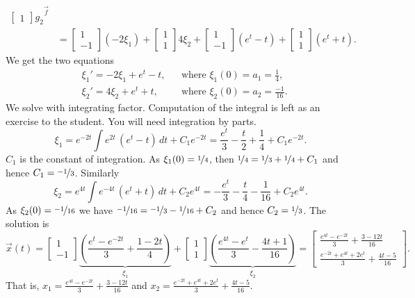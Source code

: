 \begin{example}
\begin{equation*}
\begin{split}
{\begin{bmatrix}
1
\end{bmatrix} g_2
}^{\vec{f}}
\\
& =
\begin{bmatrix}
1 \\
-1
\end{bmatrix} (-2\xi_1) +
\begin{bmatrix}
1 \\
1
\end{bmatrix} 4\xi_2
+
\begin{bmatrix}
1 \\
-1
\end{bmatrix} (e^t - t)
+
\begin{bmatrix}
1 \\
1
\end{bmatrix} (e^t + t) .
\end{split}
\end{equation*}
We get the two equations
\begin{align*}
& \xi_1' = -2\xi_1 + e^t -t, & & \text{where } \xi_1(0) = a_1 = \frac{1}{4} , \\
& \xi_2' = 4\xi_2 + e^t + t, & & \text{where } \xi_2(0) = a_2 = \frac{-1}{16} .
\end{align*}
We solve with integrating factor.  Computation of the integral is left as
an exercise to the student.  You will need integration by parts.
\begin{equation*}
\xi_1 = e^{-2t}\int e^{2t} \, (e^t-t) \, dt + C_1 e^{-2t} = 
\frac{e^t}{3}-\frac{t}{2}+\frac{1}{4}+C_1 e^{-2t} .
\end{equation*}
$C_1$ is the constant of integration.
As $\xi_1(0) = \nicefrac{1}{4}$, then $\nicefrac{1}{4}= \nicefrac{1}{3}
+ \nicefrac{1}{4} + C_1$ and hence
$C_1 = \nicefrac{-1}{3}$.
Similarly
\begin{equation*}
\xi_2 = e^{4t}\int e^{-4t} \, (e^t+ t) \, dt + C_2 e^{4t} = 
-\frac{e^t}{3}-\frac{t}{4}-\frac{1}{16} + C_2 e^{4t} .
\end{equation*}
As $\xi_2(0) = \nicefrac{-1}{16}$ we have $\nicefrac{-1}{16}= \nicefrac{-1}{3}
-\nicefrac{1}{16} + C_2$ and hence
$C_2 = \nicefrac{1}{3}$.
The solution is
\begin{equation*}
\vec{x}(t)=
\begin{bmatrix}
1 \\
-1
\end{bmatrix}
\underbrace{\left( \frac{e^t-e^{-2t}}{3}+\frac{1-2t}{4} \right)}%
_{\xi_1} +
\begin{bmatrix}
1 \\
1
\end{bmatrix}
\underbrace{\left( \frac{e^{4t}-e^t}{3}-\frac{4t+1}{16} \right)}%
_{\xi_2}
=
\begin{bmatrix}
\frac{e^{4t}-e^{-2t}}{3}+\frac{3-12t}{16} \\
\frac{e^{-2t}+e^{4t}+2e^t}{3}+\frac{4t-5}{16}
\end{bmatrix} .
\end{equation*}
That is,
$x_1 = \frac{e^{4t}-e^{-2t}}{3}+\frac{3-12t}{16}$
and
$x_2 = \frac{e^{-2t}+e^{4t}+2e^t}{3}+\frac{4t-5}{16}$.
\end{example}

